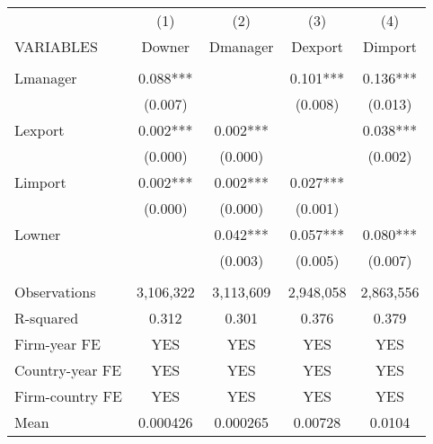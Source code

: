 \begin{tabular}{lcccc} \hline
 & (1) & (2) & (3) & (4) \\
VARIABLES & Downer & Dmanager & Dexport & Dimport \\ \hline
 &  &  &  &  \\
Lmanager & 0.088*** &  & 0.101*** & 0.136*** \\
 & (0.007) &  & (0.008) & (0.013) \\
Lexport & 0.002*** & 0.002*** &  & 0.038*** \\
 & (0.000) & (0.000) &  & (0.002) \\
Limport & 0.002*** & 0.002*** & 0.027*** &  \\
 & (0.000) & (0.000) & (0.001) &  \\
Lowner &  & 0.042*** & 0.057*** & 0.080*** \\
 &  & (0.003) & (0.005) & (0.007) \\
 &  &  &  &  \\
Observations & 3,106,322 & 3,113,609 & 2,948,058 & 2,863,556 \\
R-squared & 0.312 & 0.301 & 0.376 & 0.379 \\
Firm-year FE & YES & YES & YES & YES \\
Country-year FE & YES & YES & YES & YES \\
Firm-country FE & YES & YES & YES & YES \\
 Mean & 0.000426 & 0.000265 & 0.00728 & 0.0104 \\ \hline
\end{tabular}
